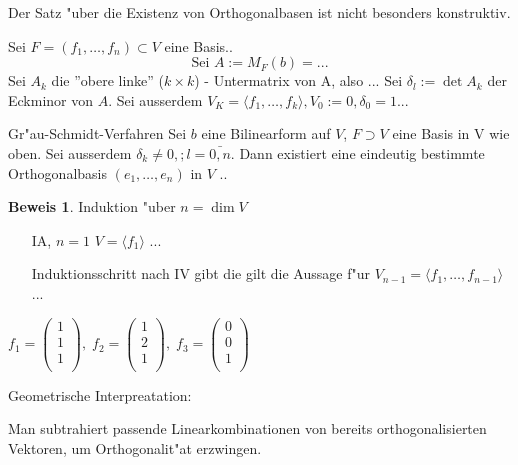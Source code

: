 \documentclass[oneside,fontsize=11pt,paper=a4,BCOR=0mm,DIV=12,automark,headsepline]{scrbook}
\theoremstyle{remark}
\theoremstyle{definition}
\theoremstyle{definition}
\newtheorem*{prof}{Beweis}
\theoremstyle{remark}
\begin{document}
Der Satz "uber die Existenz von Orthogonalbasen ist nicht besonders konstruktiv.

\begin{relation}
  Sei $F=(f_1, \ldots, f_n)\subset V$ eine Basis..
  \[\text{Sei } A:= M_F(b)=...\] Sei $A_k$ die ''obere linke'' ($k\times k$) -
  Untermatrix von A, also ...
  Sei $\delta_l:= \det A_k$ der Eckminor von $A$. Sei ausserdem $V_K=\langle
  {f_1,\ldots, f_k} \rangle, V_0:={0}, \delta_0=1$...
\end{relation}

\begin{satz}{Gr"au-Schmidt-Verfahren}
  Sei $b$ eine Bilinearform auf $V$, $F\supset V$ eine Basis in V wie oben. Sei
  ausserdem $\delta_k \not=0,; l=\bar{0,n}$. Dann existiert eine eindeutig
  bestimmte Orthogonalbasis $(e_1,\ldots,e_n)$ in $V$  ..
\end{satz}


\begin{prof}
  Induktion "uber $n=\dim V$
  \begin{itemize}
  \item[IA, $n=1$] $V=\langle {f_1} \rangle$ ...
  \item[Induktionsschritt] nach IV gibt die gilt die Aussage f"ur
    $V_{n-1}=\langle f_1,\ldots,f_{n-1} \rangle$ ...
  \end{itemize}
\end{prof}

\begin{exa}
  $f_1=\begin{pmatrix}1\\ 1\\ 1\\\end{pmatrix},\;f_2=\begin{pmatrix}1\\ 2\\ 1\\\end{pmatrix},\;f_3=\begin{pmatrix}0\\ 0\\ 1\\\end{pmatrix}$
\end{exa}

Geometrische Interpreatation:
\begin{relation}
  Man subtrahiert passende Linearkombinationen von bereits orthogonalisierten
  Vektoren, um Orthogonalit"at erzwingen.
  
\end{relation}
\end{document}
